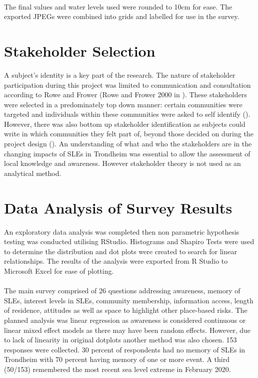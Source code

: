 \paragraph{}
The final values and water levels used were rounded to 10cm for ease. The exported JPEGs were combined into grids and labelled for use in the survey. 

\section{Stakeholder Selection}
A subject's identity is a key part of the research. The nature of stakeholder participation during this project was limited to communication and consultation according to Rowe and Frower  (Rowe and Frower 2000 in \cite{reed_stakeholder_nodate}). These stakeholders were selected in a predominately top down manner:  certain communities were targeted and individuals within these communities were asked to self identify (\cite{reed_stakeholder_nodate}). However, there was also bottom up stakeholder identification as subjects could write in which communities they felt part of, beyond those decided on during the project design (\cite{reed_stakeholder_nodate}). An understanding of what and who the stakeholders are in the changing impacts of SLEs in Trondheim was essential to allow the assessment of local knowledge and awareness. However stakeholder theory is not used as an analytical method.
\paragraph{}

\section{Data Analysis of Survey Results}
An exploratory data analysis was completed then non parametric hypothesis testing was conducted utilising RStudio. Histograms and Shapiro Tests were used to determine the distribution and dot plots were created to search for linear relationships. The results of the analysis were exported from R Studio to Microsoft Excel for ease of plotting.
\paragraph{}
The main survey comprised of 26 questions addressing awareness, memory of SLEs, interest levels in SLEs, community membership, information access, length of residence, attitudes as well as space to highlight other place-based risks. The planned analysis was linear regression as awareness is considered continuous or linear mixed effect models as there may have been random effects. However, due to lack of linearity in original dotplots another method was also chosen. 153 responses were collected. 30 percent of respondents had no memory of SLEs in Trondheim with 70 percent having memory of one or more event. A third (50/153) remembered the most recent sea level extreme in February 2020. 
